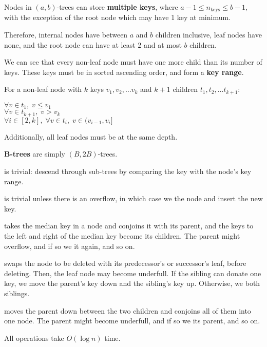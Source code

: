 Nodes in $(a, b)$-trees can store \textbf{multiple keys}, where $a - 1 \leq n_{\text{keys}} \leq b - 1$, with the exception
of the root node which may have 1 key at minimum.

Therefore, internal nodes have between $a$ and $b$ children inclusive, leaf nodes have none, and the root node can have
at least 2 and at most $b$ children.

We can see that every non-leaf node must have one more child than its number of keys.
These keys must be in sorted ascending order, and form a \textbf{key range}.

For a non-leaf node with $k$ keys $v_1, v_2, \dots v_k$ and $k + 1$ children $t_1, t_2, \dots t_{k+1}$:

$\forall v \in t_1, \; v \leq v_1$ \\
$\forall v \in t_{k+1}, \; v > v_k$ \\
$\forall i \in [2, k], \; \forall v \in t_i, \; v \in (v_{i-1}, v_i]$

Additionally, all leaf nodes must be at the same depth.

\textbf{B-trees} are simply $(B, 2B)$-trees.

 is trivial: descend through sub-trees by comparing the key with the node's key range.

 is trivial unless there is an overflow, in which case we  the node and insert the new key.

 takes the median key in a node and conjoins it with its parent, and the keys to the left and right
of the median key become its children. The parent might overflow, and if so we  it again, and so on.

 swaps the node to be deleted with its predecessor's or successor's leaf, before deleting.
Then, the leaf node may become underfull. If the sibling can donate one key, we move the parent's key
down and the sibling's key up. Otherwise, we  both siblings.

 moves the parent down between the two children and conjoins all of them into one node.
The parent might become underfull, and if so we  its parent, and so on.

All operations take $O(\log n)$ time.